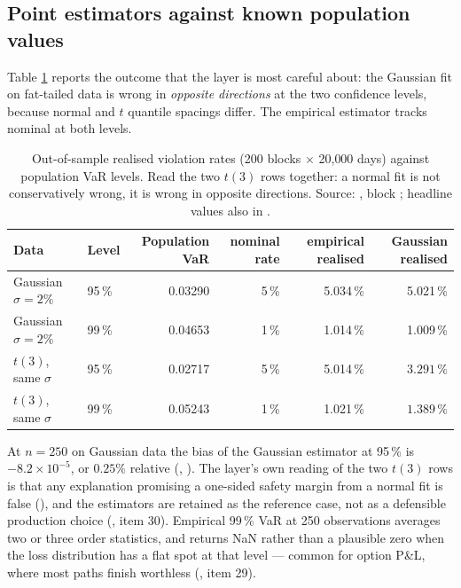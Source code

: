 \documentclass[11pt,a4paper]{article}
\begin{document}
\subsection{Point estimators against known population values}
Table \ref{tab:var} reports the outcome that the layer is most careful about: the Gaussian fit
on fat-tailed data is wrong in \emph{opposite directions} at the two confidence levels,
because normal and $t$ quantile spacings differ. The empirical estimator tracks nominal at
both levels.

\begin{table}[t]
\caption[Out-of-sample realised violation rates (200 blocks $\times$ 20{,}000 days) again]{Out-of-sample realised violation rates (200 blocks $\times$ 20{,}000 days) against
population VaR levels. Read the two $t(3)$ rows together: a normal fit is not conservatively
wrong, it is wrong in opposite directions. Source:
, block
; headline values also in .}
\label{tab:var}
\centering\small\setlength{\tabcolsep}{4pt}
\begin{tabular}{llrrrr}
\toprule
Data & Level & Population VaR & nominal rate & empirical realised & Gaussian realised \\
\midrule
Gaussian $\sigma=2\%$ & 95\,\% & 0.03290 & 5\,\% & 5.034\,\% & 5.021\,\% \\
Gaussian $\sigma=2\%$ & 99\,\% & 0.04653 & 1\,\% & 1.014\,\% & 1.009\,\% \\
$t(3)$, same $\sigma$ & 95\,\% & 0.02717 & 5\,\% & 5.014\,\% & $\mathbf{3.291\,\%}$ \\
$t(3)$, same $\sigma$ & 99\,\% & 0.05243 & 1\,\% & 1.021\,\% & $\mathbf{1.389\,\%}$ \\
\bottomrule
\end{tabular}
\end{table}

At $n = 250$ on Gaussian data the bias of the Gaussian estimator at 95\,\% is
$-8.2\times 10^{-5}$, or $0.25\%$ relative
(,
). The layer's own reading of the two
$t(3)$ rows is that any explanation promising a one-sided safety margin from a normal fit is
false (), and the estimators are retained as the reference
case, not as a defensible production choice (, item 30). Empirical
99\,\% VaR at 250 observations averages two or three order statistics, and
 returns NaN rather than a plausible zero when the loss
distribution has a flat spot at that level --- common for option P\&L, where most paths finish
worthless (, item 29).
\end{document}
